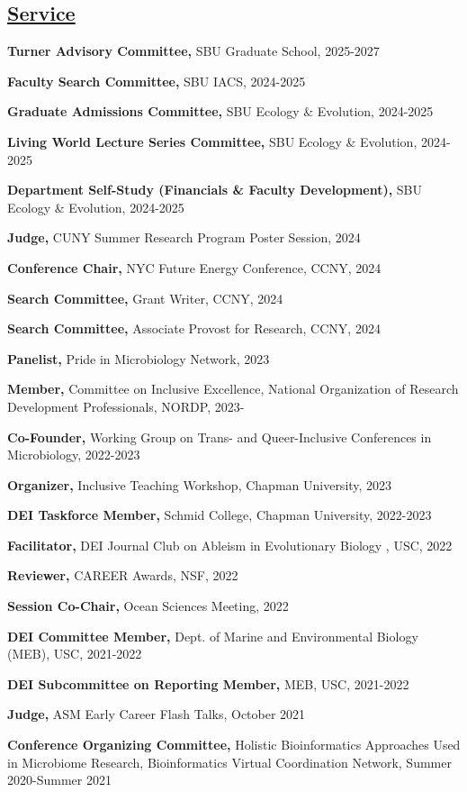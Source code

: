 \documentclass[]{res}
\begin{document}
\begin{resume}
\section{\underline{Service}} \vspace{2mm}

{\bf Turner Advisory Committee,} SBU Graduate School, 2025-2027

{\bf Faculty Search Committee,} SBU IACS, 2024-2025

{\bf Graduate Admissions Committee,} SBU Ecology \& Evolution, 2024-2025

{\bf Living World Lecture Series Committee,} SBU Ecology \& Evolution, 2024-2025

{\bf Department Self-Study (Financials \& Faculty Development),} SBU Ecology \& Evolution, 2024-2025

{\bf Judge,} CUNY Summer Research Program Poster Session, 2024

{\bf Conference Chair,} NYC Future Energy Conference, CCNY, 2024

{\bf Search Committee,} Grant Writer, CCNY, 2024

{\bf Search Committee,} Associate Provost for Research, CCNY, 2024

{\bf Panelist,} Pride in Microbiology Network, 2023

{\bf Member,} Committee on Inclusive Excellence, National Organization of Research Development Professionals, NORDP, 2023-

{\bf Co-Founder,} Working Group on Trans- and Queer-Inclusive Conferences in Microbiology, 2022-2023

{\bf Organizer,} {Inclusive Teaching Workshop}, Chapman University, 2023

{\bf DEI Taskforce Member,} {Schmid College}, Chapman University, 2022-2023

{\bf Facilitator,} DEI Journal Club on Ableism in Evolutionary Biology , USC, 2022

{\bf Reviewer,} CAREER Awards, NSF, 2022

{\bf Session Co-Chair,} {Ocean Sciences Meeting}, 2022

{\bf DEI Committee Member,} {Dept. of Marine and Environmental Biology (MEB)}, USC, 2021-2022

{\bf DEI Subcommittee on Reporting Member,} {MEB}, USC, 2021-2022

{\bf Judge,} ASM Early Career Flash Talks, October 2021

{\bf Conference Organizing Committee,} {Holistic Bioinformatics Approaches Used in Microbiome Research}, Bioinformatics Virtual Coordination Network, Summer 2020-Summer 2021


\end{resume}
\end{document}
